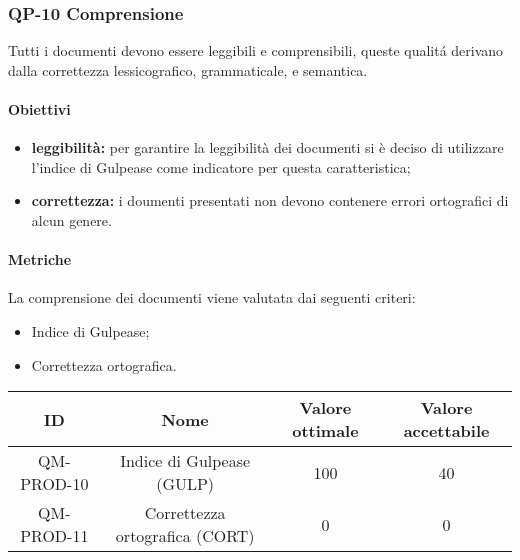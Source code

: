 \subsubsection{QP-10 Comprensione}
Tutti i documenti devono essere leggibili e comprensibili, queste qualitá derivano dalla correttezza lessicografico, grammaticale, e semantica.
	\paragraph{Obiettivi}
		\begin{itemize}
			\item \textbf{leggibilità:} per garantire la leggibilità dei documenti si è deciso di utilizzare l'indice di Gulpease come indicatore per questa caratteristica;
			\item \textbf{correttezza:} i doumenti presentati non devono contenere errori ortografici di alcun genere.
		\end{itemize}
	\paragraph{Metriche}
	La comprensione dei documenti viene valutata dai seguenti criteri:
	\begin{itemize}
		\item Indice di Gulpease;
    \item Correttezza ortografica.
	\end{itemize}
	\begin{center}
		\begin{tabular}{|c|c|c|c|}
			\hline
			ID & Nome & Valore ottimale & Valore accettabile \\
			\hline
			QM-PROD-10 & Indice di Gulpease (GULP) & 100 & 40 \\
      \hline
			QM-PROD-11 & Correttezza ortografica (CORT) & 0 & 0 \\
			\hline
		\end{tabular}
	\end{center}
